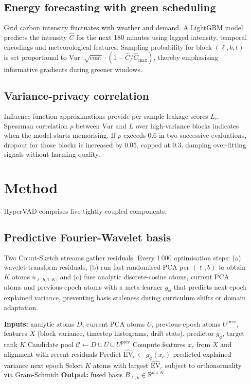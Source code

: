 \documentclass{article}
\begin{document}
\subsection{Energy forecasting with green scheduling}
Grid carbon intensity fluctuates with weather and demand. A LightGBM model predicts the intensity $\hat{C}$ for the next 180 minutes using lagged intensity, temporal encodings and meteorological features. Sampling probability for block $(\ell, b, t)$ is set proportional to $\mathrm{Var}\cdot \sqrt{\mathrm{cost}}\cdot \left(1 - \hat{C}/\hat{C}_{\max}\right)$, thereby emphasising informative gradients during greener windows.

\subsection{Variance-privacy correlation}
Influence-function approximations provide per-sample leakage scores $L_i$. Spearman correlation $\rho$ between $\mathrm{Var}$ and $L$ over high-variance blocks indicates when the model starts memorising. If $\rho$ exceeds 0.6 in two successive evaluations, dropout for those blocks is increased by 0.05, capped at 0.3, damping over-fitting signals without harming quality.

\section{Method}
HyperVAD comprises five tightly coupled components.

\subsection{Predictive Fourier-Wavelet basis}
Two Count-Sketch streams gather residuals. Every 1\,000 optimisation steps: (a) wavelet-transform residuals, (b) run fast randomised PCA per $(\ell, b)$ to obtain $K$ atoms $u_{\ell,b,1:K}$, and (c) fuse analytic discrete-cosine atoms, current PCA atoms and previous-epoch atoms with a meta-learner $g_{\phi}$ that predicts next-epoch explained variance, preventing basis staleness during curriculum shifts or domain adaptation.

\begin{algorithm}[t]
\caption{Meta-learned basis fusion with next-epoch variance forecasting}
\begin{algorithmic}[1]
\State \textbf{Inputs:} analytic atoms $D$, current PCA atoms $U$, previous-epoch atoms $U^{\text{prev}}$, features $X$ (block variance, timestep histograms, drift stats), predictor $g_{\phi}$, target rank $K$
\State Candidate pool $\mathcal{C} \leftarrow D \cup U \cup U^{\text{prev}}$
  \State Compute features $x_c$ from $X$ and alignment with recent residuals
  \State Predict $\widehat{\mathrm{EV}}_c \leftarrow g_{\phi}(x_c)$ \Comment predicted explained variance next epoch
\EndFor
\State Select $K$ atoms with largest $\widehat{\mathrm{EV}}_c$ subject to orthonormality via Gram-Schmidt
\State \textbf{Output:} fused basis $B_{\ell,b} \in \mathbb{R}^{d\times K}$
\end{algorithmic}
\end{algorithm}
\end{document}
